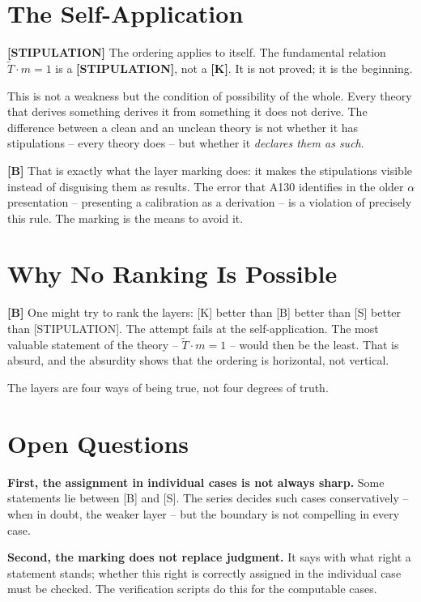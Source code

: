 \section{The Self-Application}

\textbf{[STIPULATION]} The ordering applies to itself. The fundamental relation
$\tilde T\cdot m = 1$ is a \textbf{[STIPULATION]}, not a \textbf{[K]}. It is not
proved; it is the beginning.

This is not a weakness but the condition of possibility of the whole. Every theory
that derives something derives it from something it does not derive. The difference
between a clean and an unclean theory is not whether it has stipulations -- every
theory does -- but whether it \emph{declares them as such}.

\textbf{[B]} That is exactly what the layer marking does: it makes the stipulations
visible instead of disguising them as results. The error that A130 identifies in
the older $\alpha$ presentation -- presenting a calibration as a derivation -- is a
violation of precisely this rule. The marking is the means to avoid it.

\section{Why No Ranking Is Possible}

\textbf{[B]} One might try to rank the layers: [K] better than [B] better than [S]
better than [STIPULATION]. The attempt fails at the self-application. The most
valuable statement of the theory -- $\tilde T\cdot m = 1$ -- would then be the
least. That is absurd, and the absurdity shows that the ordering is horizontal, not
vertical.

The layers are four ways of being true, not four degrees of truth.

\section{Open Questions}

\textbf{First, the assignment in individual cases is not always sharp.} Some
statements lie between [B] and [S]. The series decides such cases conservatively
-- when in doubt, the weaker layer -- but the boundary is not compelling in every
case.

\textbf{Second, the marking does not replace judgment.} It says with what right a
statement stands; whether this right is correctly assigned in the individual case
must be checked. The verification scripts do this for the computable cases.

